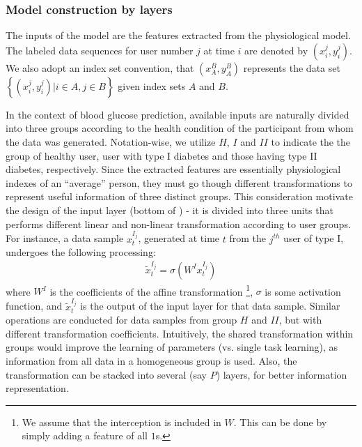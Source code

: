 \subsubsection{Model construction by layers}
The inputs of the \modelname model are the features extracted from the physiological model.
The labeled data sequences for user number $j$ at time $i$ are denoted by $(x_i^{j},y_i^{j})$.
We also adopt an index set convention, that $(x_A^{B},y_A^B)$ represents the data set $\left\{(x_i^{j},y_i^{j}) | i \in A, j\in B\right\}$ given index sets $A$ and $B$.

In the context of blood glucose prediction, available inputs are naturally divided into three groups according to the health condition of the participant from whom the data was generated.
Notation-wise, we utilize $H$, $I$ and $II$ to indicate the the group of healthy user, user with type I diabetes and those having type II diabetes, respectively.
Since the extracted features are essentially physiological indexes of an ``average'' person, they must go though different transformations to represent useful information of three distinct groups.
This consideration motivate the design of the input layer (bottom of ) - it is divided into three units that performs different linear and non-linear transformation according to user groups.
For instance, a data sample $x_t^{I_j}$, generated at time $t$ from the $j^{th}$ user of type I, undergoes the following processing:
\begin{align}
\tilde{x}_t^{I_j} = \sigma \left( W^Ix_t^{I_j} \right)
\end{align}
where $W^I$ is the coefficients of the affine transformation \footnote{We assume that the interception is included in $W$. This can be done by simply adding a feature of all $1$s.}, $\sigma$ is some activation function, and $\tilde{x}_t^{I_j}$ is the output of the input layer for that data sample.
Similar operations are conducted for data samples from group $H$ and $II$, but with different transformation coefficients.
Intuitively, the shared transformation within groups would improve the learning of parameters (vs. single task learning), as information from all data in a homogeneous group is used.
Also, the transformation can be stacked into several (say $P$) layers, for better information representation.

